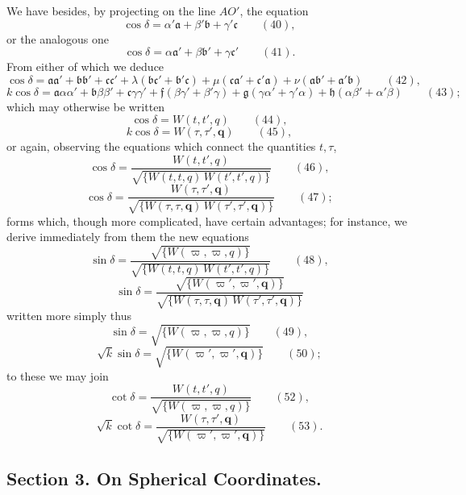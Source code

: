 \documentclass[11pt]{article}
\begin{document}
\newpage
\setcounter{page}{217}

We have besides, by projecting on the line $AO'$, the equation
\[
\cos\delta = \alpha'\mathfrak{a} + \beta'\mathfrak{b} + \gamma'\mathfrak{c} \qquad (40),
\]
or the analogous one
\[
\cos\delta = \alpha\mathfrak{a}' + \beta\mathfrak{b}' + \gamma\mathfrak{c}' \qquad (41).
\]
From either of which we deduce
\[
\cos\delta = \mathfrak{a}\mathfrak{a}' + \mathfrak{b}\mathfrak{b}' + \mathfrak{c}\mathfrak{c}' + \lambda(\mathfrak{b}\mathfrak{c}' + \mathfrak{b}'\mathfrak{c}) + \mu(\mathfrak{c}\mathfrak{a}' + \mathfrak{c}'\mathfrak{a}) + \nu(\mathfrak{a}\mathfrak{b}' + \mathfrak{a}'\mathfrak{b}) \qquad (42),
\]
\[
k\cos\delta = \mathfrak{a}\alpha\alpha' + \mathfrak{b}\beta\beta' + \mathfrak{c}\gamma\gamma' + \mathfrak{f}(\beta\gamma' + \beta'\gamma) + \mathfrak{g}(\gamma\alpha' + \gamma'\alpha) + \mathfrak{h}(\alpha\beta' + \alpha'\beta) \qquad (43);
\]
which may otherwise be written
\[
\cos\delta = W(t, t', q) \qquad (44),
\]
\[
k\cos\delta = W(\tau, \tau', \mathbf{q}) \qquad (45),
\]
or again, observing the equations which connect the quantities $t, \tau$,
\[
\cos\delta = \frac{W(t, t', q)}{\sqrt{\{W(t, t, q)\,W(t', t', q)\}}} \qquad (46),
\]
\[
\cos\delta = \frac{W(\tau, \tau', \mathbf{q})}{\sqrt{\{W(\tau, \tau, \mathbf{q})\,W(\tau', \tau', \mathbf{q})\}}} \qquad (47);
\]
forms which, though more complicated, have certain advantages; for instance, we derive immediately from them the new equations
\[
\sin\delta = \frac{\sqrt{\{W(\varpi, \varpi, q)\}}}{\sqrt{\{W(t, t, q)\,W(t', t', q)\}}} \qquad (48),
\]
\[
\sin\delta = \frac{\sqrt{\{W(\varpi', \varpi', \mathbf{q})\}}}{\sqrt{\{W(\tau, \tau, \mathbf{q})\,W(\tau', \tau', \mathbf{q})\}}}
\]
written more simply thus
\[
\sin\delta = \sqrt{\{W(\varpi, \varpi, q)\}} \qquad (49),
\]
\[
\sqrt{k}\sin\delta = \sqrt{\{W(\varpi', \varpi', \mathbf{q})\}} \qquad (50);
\]
to these we may join
\[
\cot\delta = \frac{W(t, t', q)}{\sqrt{\{W(\varpi, \varpi, q)\}}} \qquad (52),
\]
\[
\sqrt{k}\cot\delta = \frac{W(\tau, \tau', \mathbf{q})}{\sqrt{\{W(\varpi', \varpi', \mathbf{q})\}}} \qquad (53).
\]

\subsection*{Section 3. On Spherical Coordinates.}
\end{document}
